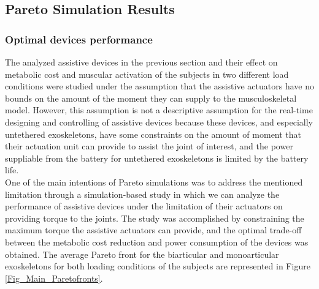 \documentclass[10pt,letterpaper]{article}
\begin{document}
\subsection*{Pareto Simulation Results}
\subsubsection*{Optimal devices performance}
The analyzed assistive devices in the previous section and their effect on metabolic cost and muscular activation of the subjects in two different load conditions were studied under the assumption that the assistive actuators have no bounds on the amount of the moment they can supply to the musculoskeletal model. However, this assumption is not a descriptive assumption for the real-time designing and controlling of assistive devices because these devices, and especially untethered exoskeletons, have some constraints on the amount of moment that their actuation unit can provide to assist the joint of interest, and the power suppliable from the battery for untethered exoskeletons is limited by the battery life. \\
One of the main intentions of Pareto simulations was to address the mentioned limitation through a simulation-based study in which we can analyze the performance of assistive devices under the limitation of their actuators on providing torque to the joints. 
The study was accomplished by constraining the maximum torque the assistive actuators can provide, and the optimal trade-off between the metabolic cost reduction and power consumption of the devices was obtained. The average Pareto front for the biarticular and monoarticular exoskeletons for both loading conditions of the subjects are represented in Figure \ref{Fig_Main_Paretofronts}.\\
\end{document}
